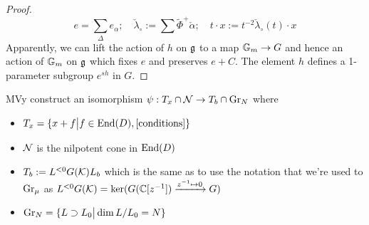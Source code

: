 \documentclass[11pt]{amsart}
\begin{document}
% 
\begin{proof}
    \begin{equation}
        e = \sum_\Delta e_\alpha; \quad 
        \check\lambda_\circ := \sum{\tilde\Phi^+} \check\alpha; \quad 
        t\cdot x := t^{-2}\check\lambda_\circ(t) \cdot x 
    \end{equation}
    Apparently, we can lift the action of \(h\) on \(\mathfrak g\) to a map \(\mathbb G_m\to G\) and hence an action of \(\mathbb G_m\) on \(\mathfrak g\) which fixes \(e\) and preserves \(e+C\). The element \(h\) defines a 1-parameter subgroup \(e^{sh}\) in \(G\). 
\end{proof}
% 
MVy construct an isomorphism \(\psi:T_x\cap\mathcal N\to T_b\cap\operatorname{Gr}_N\) where 
\begin{itemize}
    \item \(T_x = \{x + f \big| f \in \operatorname{End}(D), \text{[conditions]}\}\)
    \item \(\mathcal N \) is the nilpotent cone in \(\operatorname{End}(D)\)
    \item \(T_b := L^{<0}G(\mathcal K) L_b \) which is the same as to use the notation that we're used to \(\operatorname{Gr}_\mu \) as \(L^{<0}G(\mathcal K) = \ker(G(\mathbb C[z^{-1}])\xrightarrow{z^{-1}\mapsto 0} G)\)
    \item \(\operatorname{Gr}_N = \{L\supset L_0 \big| \dim L/L_0 = N\} \)
\end{itemize}
%
%


%
%


%
\end{document}
